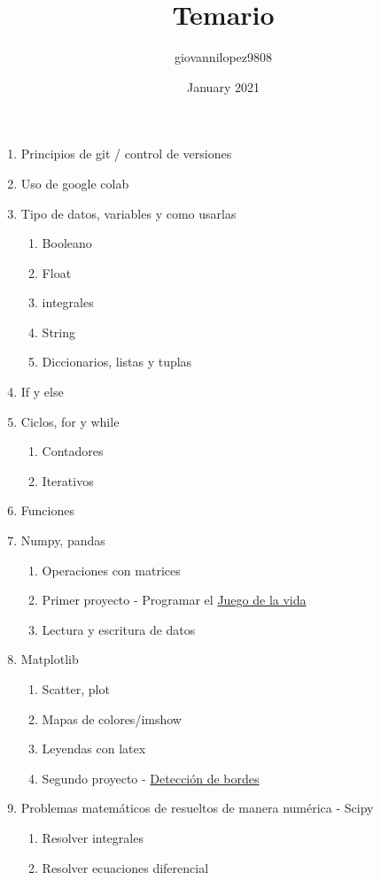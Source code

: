 \documentclass[12pt,letterpaper]{article}
\title{Temario}
\author{giovannilopez9808 }
\date{January 2021}
\begin{document}
\begin{enumerate}
    \item Principios de git / control de versiones
    \item Uso de google colab
    \item Tipo de datos, variables y como usarlas
    \begin{enumerate}
        \item Booleano
        \item Float
        \item integrales
        \item String
        \item Diccionarios, listas y tuplas
    \end{enumerate}
    \item If y else
    \item Ciclos, for y while
    \begin{enumerate}
        \item Contadores
        \item Iterativos
    \end{enumerate}
    \item Funciones
    \item Numpy, pandas
    \begin{enumerate}
        \item Operaciones con matrices
        \item Primer proyecto - Programar el \href{https://en.wikipedia.org/wiki/Conway%27s_Game_of_Life}{Juego de la vida}
        \item Lectura y escritura de datos
    \end{enumerate}
    \item Matplotlib
    \begin{enumerate}
        \item Scatter, plot
        \item Mapas de colores/imshow
        \item Leyendas con latex
        \item Segundo proyecto - \href{https://en.wikipedia.org/wiki/Edge_detection}{Detección de bordes}
    \end{enumerate}
    \item Problemas matemáticos de resueltos de manera numérica - Scipy
    \begin{enumerate}
        \item Resolver integrales
        \item Resolver ecuaciones diferencial

\end{enumerate}
\end{enumerate}
\end{document}
